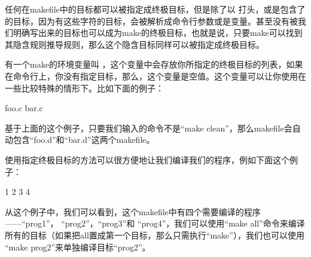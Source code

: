 \documentclass[a4paper,10pt]{sphinxmanual}
\begin{document}
任何在makefile中的目标都可以被指定成终极目标，但是除了以 \sphinxcode{\sphinxupquote{-}} 打头，或是包含了 \sphinxcode{\sphinxupquote{=}} 的目标，因为有这些字符的目标，会被解析成命令行参数或是变量。甚至没有被我们明确写出来的目标也可以成为make的终极目标，也就是说，只要make可以找到其隐含规则推导规则，那么这个隐含目标同样可以被指定成终极目标。

有一个make的环境变量叫  ，这个变量中会存放你所指定的终极目标的列表，如果在命令行上，你没有指定目标，那么，这个变量是空值。这个变量可以让你使用在一些比较特殊的情形下。比如下面的例子：

\begin{sphinxVerbatim}[commandchars=\\\{\}]
  foo.c bar.c
\end{sphinxVerbatim}

基于上面的这个例子，只要我们输入的命令不是“make clean”，那么makefile会自动包含“foo.d”和“bar.d”这两个makefile。

使用指定终极目标的方法可以很方便地让我们编译我们的程序，例如下面这个例子：

\begin{sphinxVerbatim}[commandchars=\\\{\}]
 
 1 2 3 4
\end{sphinxVerbatim}

从这个例子中，我们可以看到，这个makefile中有四个需要编译的程序——“prog1”， “prog2”，“prog3”和  “prog4”，我们可以使用“make all”命令来编译所有的目标（如果把all置成第一个目标，那么只需执行“make”），我们也可以使用 “make prog2”来单独编译目标“prog2”。
\end{document}
